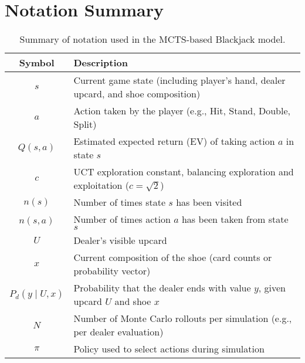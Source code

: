 \documentclass[12pt,a4paper]{cibb}
\begin{document}
\section{Notation Summary}

\begin{table}[H]
\centering
\renewcommand{\arraystretch}{1.3}
\begin{tabular}{|c|p{10cm}|}
\hline
\textbf{Symbol} & \textbf{Description} \\
\hline
$s$ & Current game state (including player's hand, dealer upcard, and shoe composition) \\
$a$ & Action taken by the player (e.g., Hit, Stand, Double, Split) \\
$Q(s, a)$ & Estimated expected return (EV) of taking action $a$ in state $s$ \\
$c$ & UCT exploration constant, balancing exploration and exploitation ($c = \sqrt{2}$) \\
$n(s)$ & Number of times state $s$ has been visited \\
$n(s, a)$ & Number of times action $a$ has been taken from state $s$ \\
$U$ & Dealer's visible upcard \\
$x$ & Current composition of the shoe (card counts or probability vector) \\
$P_d(y \mid U, x)$ & Probability that the dealer ends with value $y$, given upcard $U$ and shoe $x$ \\
$N$ & Number of Monte Carlo rollouts per simulation (e.g., per dealer evaluation) \\
$\pi$ & Policy used to select actions during simulation\\
\hline
\end{tabular}
\caption{Summary of notation used in the MCTS-based Blackjack model.}
\label{tab:notation}
\end{table}

\footnotesize

 
\normalsize
\end{document}
